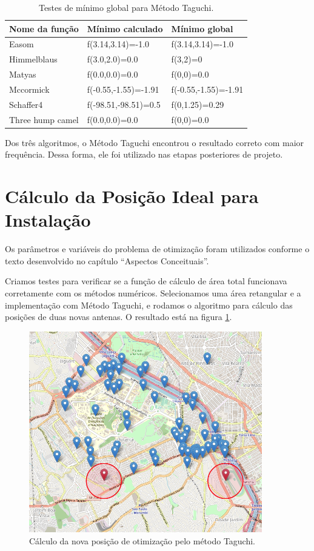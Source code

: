 \documentclass[]{politex}
\begin{document}
\begin{table}[H]
\centering
\begin{tabular}{l|l|l}
Nome da função & Mínimo calculado & Mínimo global \\ \hline
Easom  &  f(3.14,3.14)=-1.0  &  f(3.14,3.14)=-1.0 \\
Himmelblaus  &  f(3.0,2.0)=0.0  &  f(3,2)=0 \\
Matyas  &  f(0.0,0.0)=0.0  &  f(0,0)=0.0 \\
Mccormick  &  f(-0.55,-1.55)=-1.91  &  f(-0.55,-1.55)=-1.91 \\
\rowcolor{Gray}
Schaffer4  &  f(-98.51,-98.51)=0.5  &  f(0,1.25)=0.29 \\
Three hump camel  &  f(0.0,0.0)=0.0  &  f(0,0)=0.0 \\
\end{tabular}
\caption{Testes de mínimo global para Método Taguchi.}
\label{table:test-taguchi}
\end{table}

Dos três algoritmos, o Método Taguchi encontrou o resultado correto com maior
frequência. Dessa forma, ele foi utilizado nas etapas posteriores de projeto.

\section{Cálculo da Posição Ideal para Instalação}

Os parâmetros e variáveis do problema de otimização foram utilizados conforme o
texto desenvolvido no capítulo ``Aspectos Conceituais''.

Criamos testes para verificar se a função de cálculo de área total funcionava
corretamente com os métodos numéricos. Selecionamos uma área retangular e a
implementação com Método Taguchi, e rodamos o algoritmo para cálculo das
posições de duas novas antenas. O resultado está na figura
\ref{fig:taguchi_exemplo}.

\begin{figure}[H]
    \centering
    \includegraphics[width=4in]{imagens/taguchi-exemplo}
    \caption{Cálculo da nova posição de otimização pelo método Taguchi.}
    \label{fig:taguchi_exemplo}
\end{figure}
\end{document}
